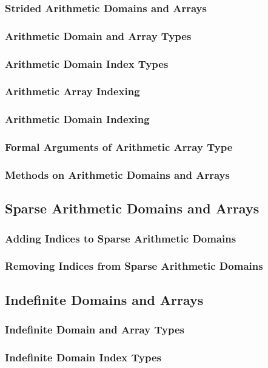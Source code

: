 \documentclass[10pt,twoside,titlepage]{article}
\begin{document}
\subsubsection{Strided Arithmetic Domains and Arrays}
\subsubsection{Arithmetic Domain and Array Types}
\subsubsection{Arithmetic Domain Index Types}
\subsubsection{Arithmetic Array Indexing}
\subsubsection{Arithmetic Domain Indexing}
\subsubsection{Formal Arguments of Arithmetic Array Type}
\subsubsection{Methods on Arithmetic Domains and Arrays}
\subsection{Sparse Arithmetic Domains and Arrays}
\subsubsection{Adding Indices to Sparse Arithmetic Domains}
\subsubsection{Removing Indices from Sparse Arithmetic Domains}
\subsection{Indefinite Domains and Arrays}
\subsubsection{Indefinite Domain and Array Types}
\subsubsection{Indefinite Domain Index Types}
\end{document}
